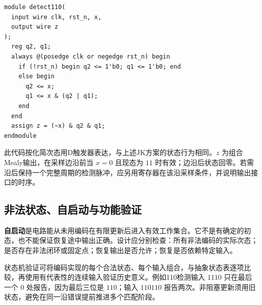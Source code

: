 \documentclass[UTF8,fontset=none,zihao=-4,a4paper]{ctexart}
\newcommand{\term}[1]{\textbf{#1}}
\begin{document}
\par\noindent\begin{minipage}{\linewidth}
\begin{lstlisting}
module detect110(
  input wire clk, rst_n, x,
  output wire z
);
  reg q2, q1;
  always @(posedge clk or negedge rst_n) begin
    if (!rst_n) begin q2 <= 1'b0; q1 <= 1'b0; end
    else begin
      q2 <= x;
      q1 <= x & (q2 | q1);
    end
  end
  assign z = (~x) & q2 & q1;
endmodule
\end{lstlisting}
\end{minipage}\par
此代码按化简次态用D触发器表达，与上述JK方案的状态行为相同。$z$ 为组合Mealy输出，在采样边沿前当 $x=0$ 且现态为 $11$ 时有效；边沿后状态回零。若需沿后保持一个完整周期的检测脉冲，应另用寄存器在该沿采样条件，并说明输出接口的时序。

\subsection{非法状态、自启动与功能验证}
\term{自启动}是电路能从未用编码在有限更新后进入有效工作集合。它不是有确定的初态，也不能保证恢复途中输出正确。设计应分别检查：所有非法编码的实际次态；是否存在非法闭环或固定点；恢复输出是否允许；恢复是否依赖特定输入。

状态机验证可将编码实现的每个合法状态、每个输入组合，与抽象状态表逐项比较，再使用有代表性的连续输入验证历史意义。例如110检测输入 $1110$ 只在最后一个 $0$ 处报告，因为最后三位是 $110$；输入 $110110$ 报告两次。非阻塞更新须用旧状态，避免在同一沿错误提前推进多个匹配阶段。

\Needspace{140mm}
\end{document}
